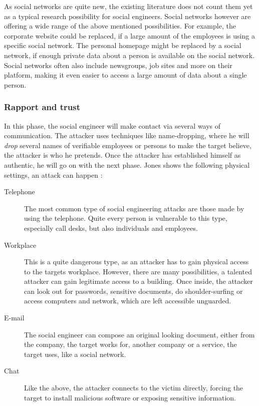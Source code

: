 As social networks are quite new, the existing literature does not count them
yet as a typical research possibility for social engineers. Social networks
however are offering a wide range of the above mentioned possibilities. For
example, the corporate website could be replaced, if a large amount of the
employees is using a specific social network. The personal homepage might be
replaced by a social network, if enough private data about a person is
available on the social network. Social networks often also include newsgroups,
job sites and more on their platform, making it even easier to access a large
amount of data about a single person.


\subsubsection{Rapport and trust}

In this phase, the social engineer will make contact via several ways of
communication. The attacker uses techniques like name-dropping, where he will
\textit{drop} several names of verifiable employees or persons to make the
target believe, the attacker is who he pretends. Once the attacker has
established himself as authentic, he will go on with the next phase. Jones
shows the following physical settings, an attack can happen \cite{jones2004}:

\begin{description}
\item[Telephone] The most common type of social engineering attacks are those
  made by using the telephone. Quite every person is vulnerable to this type,
  especially call desks, but also individuals and employees.
\item[Workplace] This is a quite dangerous type, as an attacker has to gain
  physical access to the targets workplace. However, there are many
  possibilities, a talented attacker can gain legitimate access to a building.
  Once inside, the attacker can look out for passwords, sensitive documents,
  do shoulder-surfing or access computers and network, which are left
  accessible unguarded.
\item[E-mail] The social engineer can compose an original looking document,
  either from the company, the target works for, another company or a service,
  the target uses, like a social network.
\item[Chat] Like the above, the attacker connects to the victim directly,
  forcing the target to install malicious software or exposing sensitive
  information.
\end{description}


